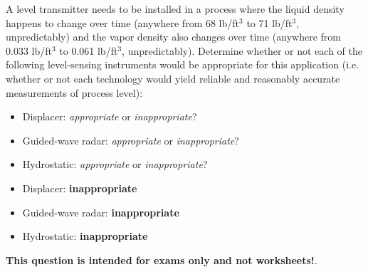 

A level transmitter needs to be installed in a process where the liquid density happens to change over time (anywhere from 68 lb/ft$^{3}$ to 71 lb/ft$^{3}$, unpredictably) and the vapor density also changes over time (anywhere from 0.033 lb/ft$^{3}$ to 0.061 lb/ft$^{3}$, unpredictably).  Determine whether or not each of the following level-sensing instruments would be appropriate for this application (i.e. whether or not each technology would yield reliable and reasonably accurate measurements of process level):

\begin{itemize}
\item{} Displacer: {\it appropriate} or {\it inappropriate}?
\vskip 10pt
\item{} Guided-wave radar: {\it appropriate} or {\it inappropriate}?
\vskip 10pt
\item{} Hydrostatic: {\it appropriate} or {\it inappropriate}?
\end{itemize}







\begin{itemize}
\item{} Displacer: {\bf inappropriate}
\vskip 10pt
\item{} Guided-wave radar: {\bf inappropriate}
\vskip 10pt
\item{} Hydrostatic: {\bf inappropriate}
\end{itemize}







{\bf This question is intended for exams only and not worksheets!}.



